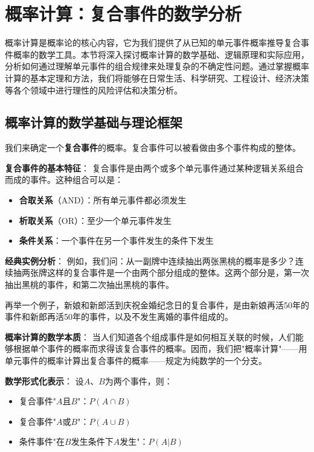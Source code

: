 \section{概率计算：复合事件的数学分析}

\begin{logicbox}[title=引言]
概率计算是概率论的核心内容，它为我们提供了从已知的单元事件概率推导复合事件概率的数学工具。本节将深入探讨概率计算的数学基础、逻辑原理和实际应用，分析如何通过理解单元事件的组合规律来处理复杂的不确定性问题。通过掌握概率计算的基本定理和方法，我们将能够在日常生活、科学研究、工程设计、经济决策等各个领域中进行理性的风险评估和决策分析。
\end{logicbox}

\subsection{概率计算的数学基础与理论框架}

\begin{theorembox}[title=复合事件的数学定义与结构]
我们来确定一个\textbf{复合事件}的概率。复合事件可以被看做由多个事件构成的整体。

\textbf{复合事件的基本特征}：
复合事件是由两个或多个单元事件通过某种逻辑关系组合而成的事件。这种组合可以是：
\begin{itemize}
\item \textbf{合取关系}（AND）：所有单元事件都必须发生
\item \textbf{析取关系}（OR）：至少一个单元事件发生
\item \textbf{条件关系}：一个事件在另一个事件发生的条件下发生
\end{itemize}

\textbf{经典实例分析}：
例如，我们问：从一副牌中连续抽出两张黑桃的概率是多少？连续抽两张牌这样的复合事件是一个由两个部分组成的整体。这两个部分是，第一次抽出黑桃的事件，和第二次抽出黑桃的事件。

再举一个例子，新娘和新郎活到庆祝金婚纪念日的复合事件，是由新娘再活50年的事件和新郎再活50年的事件，以及不发生离婚的事件组成的。

\textbf{概率计算的数学本质}：
当人们知道各个组成事件是如何相互关联的时候，人们能够根据单个事件的概率而求得该复合事件的概率。因而，我们把"概率计算"——用单元事件的概率计算出复合事件的概率——规定为纯数学的一个分支。

\textbf{数学形式化表示}：
设$A$、$B$为两个事件，则：
\begin{itemize}
\item 复合事件"$A$且$B$"：$P(A \cap B)$
\item 复合事件"$A$或$B$"：$P(A \cup B)$
\item 条件事件"在$B$发生条件下$A$发生"：$P(A|B)$
\end{itemize}
\end{theorembox}

